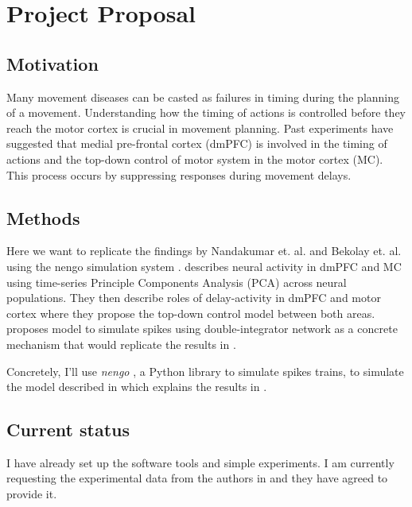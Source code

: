 \documentclass[a4paper]{article}
\begin{document}
\section*{Project Proposal}

\subsection*{Motivation}

Many movement diseases can be casted as failures in timing during the planning of a movement.
Understanding how the timing of actions is controlled before
they reach the motor cortex is crucial in movement planning.
Past experiments have suggested that medial pre-frontal cortex (dmPFC)
is involved in the timing of actions and the top-down control of motor system
in the motor cortex (MC). This process occurs by suppressing responses
during movement delays.


\subsection*{Methods}

Here we want to replicate the findings by Nandakumar et. al. \cite{narayanan2009delay}
and Bekolay et. al. \cite{bekolay2014spiking} using the nengo simulation system \cite{bekolay2013nengo}.
\cite{narayanan2009delay} describes neural activity in dmPFC and MC using
time-series Principle Components Analysis (PCA) across neural populations.
They then describe roles of delay-activity in dmPFC and motor cortex where
they propose the top-down control model between both areas. \cite{bekolay2014spiking}
proposes model to simulate spikes using double-integrator network as a concrete
mechanism that would replicate the results in \cite{narayanan2009delay}.

Concretely, I'll use \textit{nengo} \cite{bekolay2013nengo}, a Python library to simulate spikes trains,
to simulate the model described in \cite{bekolay2014spiking} which
explains the results in \cite{narayanan2009delay}.


\subsection*{Current status}

I have already set up the software tools and simple experiments.
I am currently requesting the experimental data from the authors in
\cite{narayanan2009delay} and they have agreed to provide it.


{}

\end{document}
